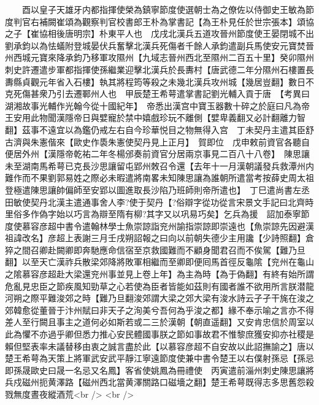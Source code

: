 　　酉以皇子天雄牙内都指揮使榮為鎮寧節度使選朝士為之僚佐以侍御史王敏為節度判官右補闕崔頌為觀察判官校書郎王朴為掌書記【為王朴見任於世宗張本】頌協之子【崔協相後唐明宗】朴東平人也　戊戌北漢兵五道攻晉州節度使王晏閉城不出劉承鈞以為怯蟻附登城晏伏兵奮擊北漢兵死傷者千餘人承鈞遣副兵馬使安元寶焚晉州西城元寶來降承鈞乃移軍攻隰州【九域志晉州西北至隰州二百五十里】癸卯隰州刺史許遷遣步軍都指揮使孫繼業迎擊北漢兵於長夀村【唐武德二年分隰州石樓置長夀縣貞觀元年省入石樓】執其將程筠等殺之未幾北漢兵攻州城【幾居豈翻】數日不克死傷甚衆乃引去遷鄆州人也　甲辰楚王希萼遣掌書記劉光輔入貢于唐　【考異曰湖湘故事光輔作光翰今從十國紀年】　帝悉出漢宫中寶玉器數十碎之於庭曰凡為帝王安用此物聞漢隱帝日與嬖寵於禁中嬉戲珍玩不離側【嬖卑義翻又必計翻離力智翻】茲事不遠宜以為鑑仍戒左右自今珍華悦目之物無得入宫　丁未契丹主遣其臣舒古濟與朱憲偕來【歐史作䮍朱憲使契丹見上正月】　賀即位　戊申敕前資官各聽自便居外州【漢隱帝乾祐二年冬楊邠奏前資官分居兩京事見二百八十八卷】　陳思讓未至湖南馬希萼已克長沙思讓留屯郢州敇召令還【去年十一月漢朝議發兵救潭州内難作而不果劉郭易姓之際必未暇遣將南畧未知陳思讓為誰朝所遣當考按薛史周太祖登極遣陳思讓帥偏師至安郢以圖進取長沙陷乃班師則帝所遣也】　丁巳遣尚書左丞田敏使契丹北漢主遣通事舍人李?使于契丹【?俗辯字從功從言宋景文手記曰北齊時里俗多作偽字始以巧言為辯至隋有柳?其字又以巩易巧矣】乞兵為援　詔加泰寧節度使慕容彦超中書令遣翰林學士魚崇諒詣兖州諭指崇諒即崇遠也【魚崇諒先因避漢祖諱改名】彦超上表謝三月壬戌朔詔報之曰向以前朝失德少主用讒【少詩照翻】倉猝之間召卿赴闕卿即奔馳應命信宿至京救國難而不顧身聞君召而不俟駕【難乃旦翻】以至天亡漢祚兵散梁郊降將敗軍相繼而至卿即便囘馬首徑反龜隂【兖州在龜山之隂慕容彦超赴大梁還兖州事並見上卷上年】為主為時【為于偽翻】有終有始所謂危亂見忠臣之節疾風知勁草之心若使為臣者皆能如茲則有國者誰不欲用所言朕潜龍河朔之際平難浚郊之時【難乃旦翻浚郊謂大梁之郊大梁有浚水詩云孑孑干旄在浚之郊韓愈從董晉于汴州賦曰非天子之洵美兮吾何為乎浚之都】緣不奉示喻之言亦不得差人至行闕且事主之道何必如斯若或二三於漢朝【朝直遥翻】又安肯忠信於周室以此為懼不亦過乎卿但悉力推心安民體國事朕之節如事故君不惟黎庶獲安抑亦社稷是賴但堅表率未議替移由衷之誠言盡於此【以慕容彦超不自安故以此詔撫諭之】唐以楚王希萼為天策上將軍武安武平靜江寧遠節度使兼中書令楚王以右僕射孫忌【孫忌即孫晟歐史曰晟一名忌又名鳳】客省使姚鳳為冊禮使　丙寅遣前淄州刺史陳思讓將兵戍磁州扼黄澤路【磁州西北當黄澤關路口磁墻之翻】楚王希萼既得志多思舊怨殺戮無度晝夜縱酒荒<br />
<br />
